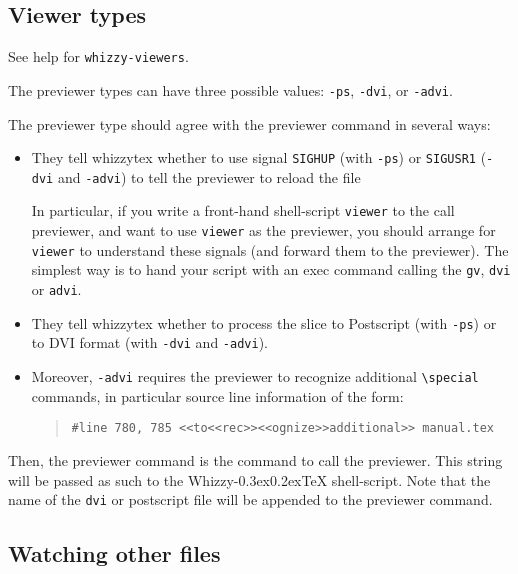\documentclass[12pt]{article}
\makeatletter
\let \lst \verb
\def \whizzy {{Whizzy\kern -0.3ex\raise 0.2ex\hbox{\let \@\relax\TeX}}}
\makeatother
\begin{document}
\subsection {Viewer types}
\label {types}

See help for \lst"whizzy-viewers".

The previewer types can have three possible values:
{\tt -ps}, {\tt -dvi}, or {\tt -advi}. 

The previewer type should agree with the previewer command in several ways:
\begin {itemize}

\item
They tell whizzytex whether to use signal {\tt SIGHUP} (with {\tt -ps})
or {\tt SIGUSR1}  ({\tt -dvi} and {\tt -advi}) to tell the previewer to
reload the file

In particular, if you write a front-hand shell-script \lst"viewer" to the
call previewer,  and want to use \lst"viewer" as the previewer, you should 
arrange for \lst"viewer" to understand these signals (and forward them to the
previewer). The simplest way is to hand your script with an exec command
calling the \lst"gv", \lst"dvi" or \lst"advi".



\item
They tell whizzytex whether to process the slice to 
Postscript (with {\tt -ps}) or to DVI format (with {\tt -dvi} and {\tt -advi}). 

\item
Moreover, {\tt -advi} requires the previewer to 
recognize additional \lst"\special" commands, in particular
source line information of the form: 
\begin{quote}
\begin{verbatim}
#line 780, 785 <<to<<rec>><<ognize>>additional>> manual.tex
\end{verbatim}
\end{quote}

\end {itemize}
Then, the previewer command is the command to call the previewer.  This
string will be passed as such to the {\whizzy} shell-script. Note that the
name of the \lst"dvi" or postscript file will be appended to the previewer
command.

\subsection {Watching other files}
\label {sec/watch}
\end{document}
